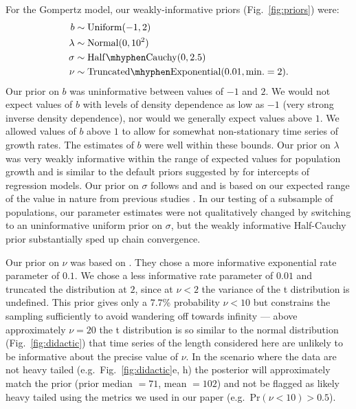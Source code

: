 For the Gompertz model, our weakly-informative priors (Fig.~\ref{fig:priors}) were:
\begin{align*}
b &\sim \mathrm{Uniform}(-1, 2)\\
\lambda &\sim \mathrm{Normal}(0, 10^2)\\
\sigma &\sim \mathrm{Half\mhyphen Cauchy} (0, 2.5)\\
\nu &\sim \mathrm{Truncated\mhyphen Exponential}(0.01, \mathrm{min.} = 2). \end{align*}
Our prior on $b$ was uninformative between values of $-1$ and $2$. We would not
expect values of $b$ with levels of density dependence as low as $-1$ (very
strong inverse density dependence), nor would we generally expect values above $1$. We
allowed values of $b$ above $1$ to allow for somewhat non-stationary time
series of growth rates. The estimates of $b$ were well within these bounds. Our
prior on $\lambda$ was very weakly informative within the range of expected
values for population growth and is similar to the default priors suggested by
\citet{gelman2008d} for intercepts of regression models. Our prior on $\sigma$
follows \citet{gelman2006c} and \citet{gelman2008d} and is based on our
expected range of the value in nature from previous studies
\citep[e.g.][]{connors2014}. In our testing of a subsample of populations, our
parameter estimates were not qualitatively changed by switching to an
uninformative uniform prior on $\sigma$, but the weakly informative Half-Cauchy prior
substantially sped up chain convergence.

Our prior on $\nu$ was based on \citet{fernandez1998}. They chose a more
informative exponential rate parameter of $0.1$. We chose a less informative
rate parameter of $0.01$ and truncated the distribution at $2$, since at $\nu
< 2$ the variance of the t distribution is undefined. This prior gives only
a $7.7$\% probability $\nu < 10$ but constrains the sampling sufficiently to
avoid wandering off towards infinity --- above approximately $\nu = 20$ the
t distribution is so similar to the normal distribution
(Fig.~\ref{fig:didactic}) that time series of the length considered here are
unlikely to be informative about the precise value of $\nu$. In the
scenario where the data are not heavy tailed (e.g.~Fig.~\ref{fig:didactic}e, h)
the posterior will approximately match the prior (prior median $= 71$, mean $= 102$)
and not be flagged as likely heavy tailed using the metrics we used in our paper
(e.g.~Pr$(\nu < 10) > 0.5$).

